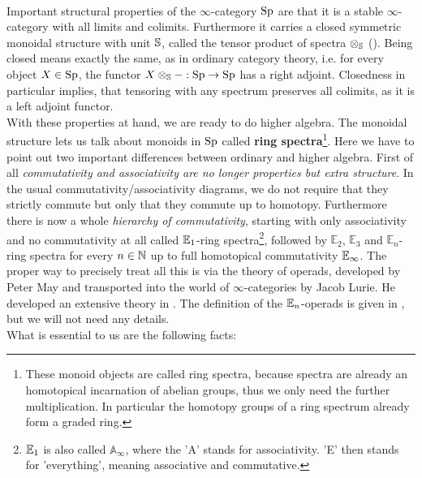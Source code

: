 \\
Important structural properties of the $\infty$-category $\Sp$ are that it is a stable $\infty$-category with all limits and colimits. 
Furthermore it carries a closed symmetric monoidal structure with unit $\S$, called the tensor product of spectra $\otimes_\S$ (\cite[Corollary~4.8.2.19]{lurie2017higher}).
Being closed means exactly the same, as in ordinary category theory, i.e. for every object $X\in \Sp$, the functor $X\otimes_\S-:\Sp\to \Sp $ has a right adjoint. 
Closedness in particular implies, that tensoring with any spectrum preserves all colimits, as it is a left adjoint functor. \\
With these properties at hand, we are ready to do higher algebra.
The monoidal structure lets us talk about monoids in $\Sp$ called \textbf{ring spectra}\footnote{These monoid objects are called ring spectra, because spectra are already an homotopical incarnation of abelian groups, thus we only need the further multiplication. In particular the homotopy groups of a ring spectrum already form a graded ring.}.
Here we have to point out two important differences between ordinary and higher algebra. 
First of all \textit{commutativity and associativity are no longer  properties but extra structure}. In the usual commutativity/associativity diagrams, we do not require that they strictly commute but only that they commute up to homotopy. 
Furthermore there is now a whole \textit{hierarchy of commutativity}, starting with only associativity and no commutativity at all called $\Eone$-ring spectra\footnote{$\Eone$ is also called $\mathbb{A}_\infty$, where the 'A' stands for associativity. 'E' then stands for 'everything', meaning associative and commutative.}, followed by $\mathbb{E}_2$, $\mathbb{E}_3$ and $\mathbb{E}_n$-ring spectra for every $n\in \N$ up to full homotopical commutativity $\Einf$. 
The proper way to precisely treat all this is via the theory of operads, developed by Peter May and transported into the world of $\infty$-categories by Jacob Lurie. 
He developed an extensive theory in \cite[Chapter~2,3,4]{lurie2017higher}. The definition of the $\En$-operads is given in \cite[Definition~5.1.0.2]{lurie2017higher}, but we will not need any details. \\
What is essential to us are the following facts:

